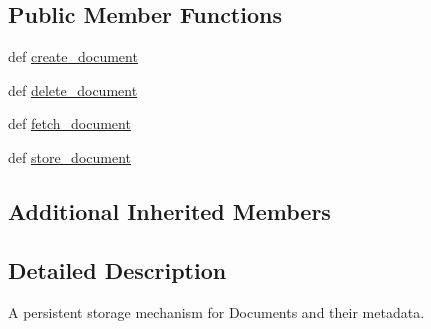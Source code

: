 \subsection*{Public Member Functions}
\begin{DoxyCompactItemize}
\item 
def \hyperlink{classcheshire3_1_1base_objects_1_1_document_store_a480cdd91a4ee430317f23a920e862311}{create\-\_\-document}
\item 
def \hyperlink{classcheshire3_1_1base_objects_1_1_document_store_a3d949a8ff6ebd02f98fef3f2cc26260b}{delete\-\_\-document}
\item 
def \hyperlink{classcheshire3_1_1base_objects_1_1_document_store_ae74916480db8e8859d05ce4cfe9f1604}{fetch\-\_\-document}
\item 
def \hyperlink{classcheshire3_1_1base_objects_1_1_document_store_a658e6dd2c54423d0c7089fc1859a6ca7}{store\-\_\-document}
\end{DoxyCompactItemize}
\subsection*{Additional Inherited Members}


\subsection{Detailed Description}
\begin{DoxyVerb}A persistent storage mechanism for Documents and their metadata.\end{DoxyVerb}
 

